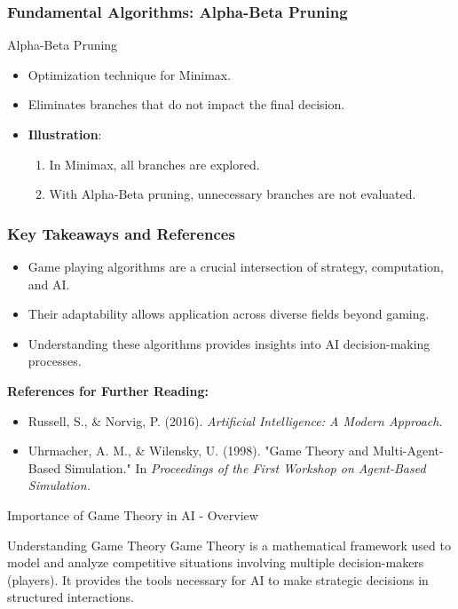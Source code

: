 \documentclass[aspectratio=169]{beamer}
\begin{document}
\begin{frame}[fragile]
    \frametitle{Fundamental Algorithms: Alpha-Beta Pruning}
    \begin{block}{Alpha-Beta Pruning}
        \begin{itemize}
            \item Optimization technique for Minimax.
            \item Eliminates branches that do not impact the final decision.
        \end{itemize}
        \begin{itemize}
            \item \textbf{Illustration}:
                \begin{enumerate}
                    \item In Minimax, all branches are explored.
                    \item With Alpha-Beta pruning, unnecessary branches are not evaluated.
                \end{enumerate}
        \end{itemize}
    \end{block}
\end{frame}

\begin{frame}[fragile]
    \frametitle{Key Takeaways and References}
    \begin{itemize}
        \item Game playing algorithms are a crucial intersection of strategy, computation, and AI.
        \item Their adaptability allows application across diverse fields beyond gaming.
        \item Understanding these algorithms provides insights into AI decision-making processes.
    \end{itemize}
    
    \textbf{References for Further Reading:}
    \begin{itemize}
        \item Russell, S., \& Norvig, P. (2016). \textit{Artificial Intelligence: A Modern Approach}.
        \item Uhrmacher, A. M., \& Wilensky, U. (1998). "Game Theory and Multi-Agent-Based Simulation." In \textit{Proceedings of the First Workshop on Agent-Based Simulation.}
    \end{itemize}
\end{frame}

\begin{frame}[fragile]{Importance of Game Theory in AI - Overview}
    \begin{block}{Understanding Game Theory}
        Game Theory is a mathematical framework used to model and analyze competitive situations involving multiple decision-makers (players). It provides the tools necessary for AI to make strategic decisions in structured interactions.
    \end{block}
\end{frame}
\end{document}
